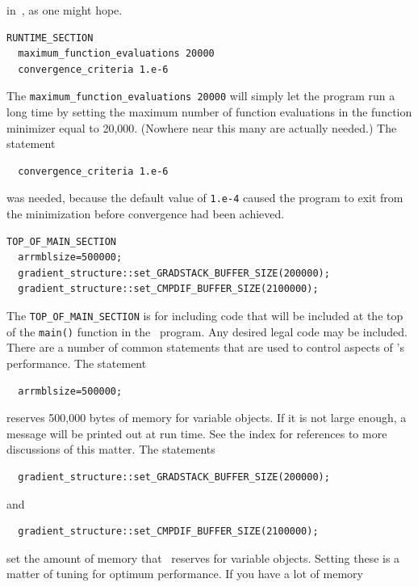 \documentclass{admbmanual}
\begin{document}
in~\cite{hamilton1989}, as one might hope.
\begin{lstlisting}
RUNTIME_SECTION
  maximum_function_evaluations 20000
  convergence_criteria 1.e-6
\end{lstlisting}
The \texttt{maximum\_function\_evaluations 20000} will simply let the program
run a long time by setting the maximum number of function evaluations in the
function minimizer equal to 20,000. (Nowhere near this many are actually
needed.) The statement
\begin{lstlisting}
  convergence_criteria 1.e-6
\end{lstlisting}
was needed, because the default value of \texttt{1.e-4} caused the program to
exit from the minimization before convergence had been achieved.
%
{}
%
{}
\begin{lstlisting}
TOP_OF_MAIN_SECTION
  arrmblsize=500000;
  gradient_structure::set_GRADSTACK_BUFFER_SIZE(200000);
  gradient_structure::set_CMPDIF_BUFFER_SIZE(2100000);
\end{lstlisting}
The \texttt{TOP\_OF\_MAIN\_SECTION} is for including code that will be included
at the top of the \texttt{main()} function in the \cplus\ program. Any desired
legal code may be included. There are a number of common statements that are
used to control aspects of \ADM's performance. The statement
\begin{lstlisting}
  arrmblsize=500000;
\end{lstlisting}
reserves 500,000 bytes of memory for variable objects. If it is not large
enough, a message will be printed out at run time. See the index for references
to more discussions of this matter. The statements
\begin{lstlisting}
  gradient_structure::set_GRADSTACK_BUFFER_SIZE(200000);
\end{lstlisting}
and
\begin{lstlisting}
  gradient_structure::set_CMPDIF_BUFFER_SIZE(2100000);
\end{lstlisting}
set the amount of memory that \ADM\ reserves for variable objects. Setting these
is a matter of tuning for optimum performance. If you have a lot of memory
\end{document}
